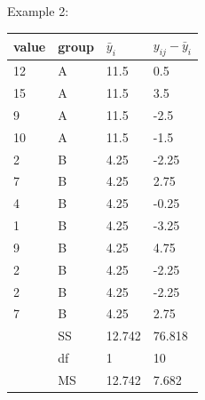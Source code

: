 \begin{frame}{Example 2:}

\begin{tabular}{ll|ll}
  \hline
  value & group & $\bar y_i$ & $y_{ij} - \bar y_i$ \\ 
  \hline
12  &   A  &       11.5  &       0.5      \\
15  &   A  &       11.5  &       3.5      \\
9   &   A  &       11.5  &       -2.5     \\
10  &   A  &       11.5  &       -1.5     \\
2   &   B  &       4.25  &       -2.25    \\
7   &   B  &       4.25  &       2.75     \\
4   &   B  &       4.25  &       -0.25    \\
1   &   B  &       4.25  &       -3.25    \\
9   &   B  &       4.25  &       4.75     \\
2   &   B  &       4.25  &       -2.25    \\
2   &   B  &       4.25  &       -2.25    \\
7   &   B  &       4.25  &       2.75     \\
   \hline
&   SS  &  12.742  &     76.818  \\
&   df  &  1       &     10      \\
&   MS  &  12.742  &     7.682   \\
\end{tabular}
\end{frame}

